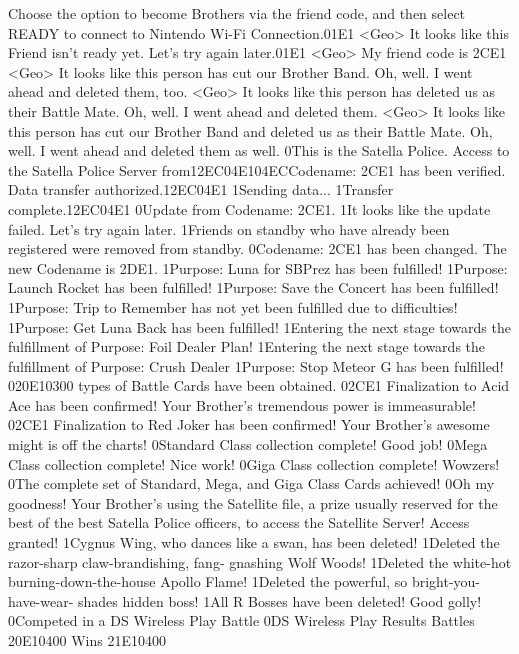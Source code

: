 Choose the option to become Brothers via the friend code, and then 
select READY to connect to Nintendo Wi-Fi Connection.{01}{E1}
<Geo> It looks like this Friend isn't ready yet. Let's try again later.{01}{E1}
<Geo> My friend code is {2C}{E1} 
<Geo> It looks like this person has cut our Brother Band. 
Oh, well. I went ahead and deleted them, too. 
<Geo> It looks like this person has deleted us as their Battle Mate. 
Oh, well. I went ahead and deleted them. 
<Geo> It looks like this person has cut our Brother Band and deleted us as their 
Battle Mate. Oh, well. I went ahead and deleted them as well. 
0This is the Satella Police. Access to the Satella Police Server from{12}{EC}{04}{E1}{04}{EC}Codename: {2C}{E1} has been verified. Data transfer authorized.{12}{EC}{04}{E1}
1Sending data...
1Transfer complete.{12}{EC}{04}{E1}
0Update from Codename: {2C}{E1}. 
1It looks like the update failed. Let's try again later. 
1Friends on standby who have already been registered were removed 
from standby. 
0Codename: {2C}{E1} has been changed. 
The new Codename is {2D}{E1}. 
1Purpose: Luna for SBPrez has been fulfilled! 
1Purpose: Launch Rocket has been fulfilled! 
1Purpose: Save the Concert has been fulfilled! 
1Purpose: Trip to Remember has not yet been fulfilled due to difficulties! 
1Purpose: Get Luna Back has been fulfilled! 
1Entering the next stage towards the fulfillment of Purpose: Foil Dealer Plan! 
1Entering the next stage towards the fulfillment of Purpose: Crush Dealer 
1Purpose: Stop Meteor G has been fulfilled! 
0{20}{E1}{03}{00} types of Battle Cards have been obtained. 
0{2C}{E1} Finalization to Acid Ace has been confirmed! 
Your Brother's tremendous power is immeasurable! 
0{2C}{E1} Finalization to Red Joker has been confirmed! 
Your Brother's awesome might is off the charts! 
0Standard Class collection complete! Good job! 
0Mega Class collection complete! Nice work! 
0Giga Class collection complete! Wowzers! 
0The complete set of Standard, Mega, and Giga Class Cards achieved! 
0Oh my goodness! Your Brother's using the Satellite file, a prize usually reserved 
for the best of the best Satella Police officers, to access the Satellite Server! 
Access granted! 
1Cygnus Wing, who dances like a swan, has been deleted! 
1Deleted the razor-sharp claw-brandishing, fang- gnashing Wolf Woods! 
1Deleted the white-hot burning-down-the-house Apollo Flame! 
1Deleted the powerful, so bright-you-have-wear- shades hidden boss! 
1All R Bosses have been deleted! Good golly! 
0Competed in a DS Wireless Play Battle 
0DS Wireless Play Results Battles {20}{E1}{04}{00} Wins {21}{E1}{04}{00} 
